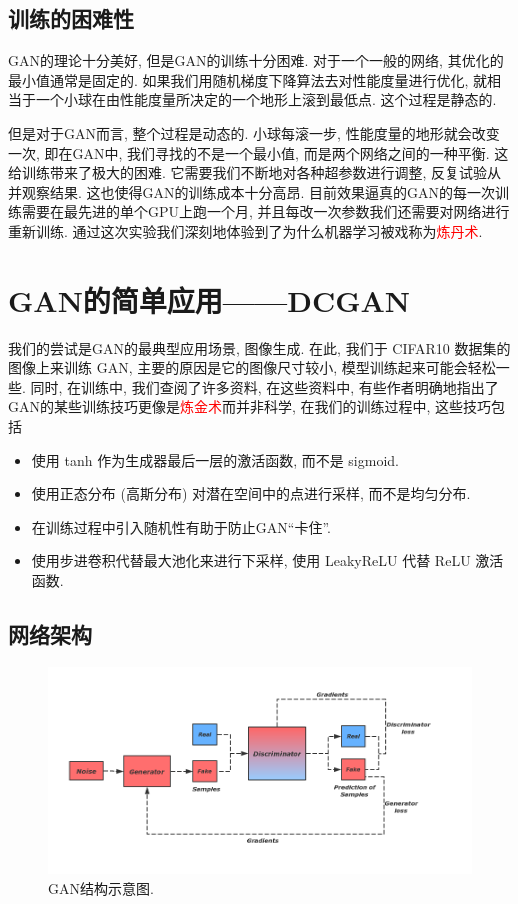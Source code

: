 \documentclass[lang=cn,11pt]{elegantpaper}
\begin{document}
\subsection{训练的困难性}

GAN的理论十分美好, 但是GAN的训练十分困难. 对于一个一般的网络, 其优化的最小值通常是固定的. 如果我们用随机梯度下降算法去对性能度量进行优化, 就相当于一个小球在由性能度量所决定的一个地形上滚到最低点. 这个过程是静态的. 

但是对于GAN而言, 整个过程是动态的. 小球每滚一步, 性能度量的地形就会改变一次, 即在GAN中, 我们寻找的不是一个最小值, 而是两个网络之间的一种平衡. 这给训练带来了极大的困难. 它需要我们不断地对各种超参数进行调整, 反复试验从并观察结果. 这也使得GAN的训练成本十分高昂. 目前效果逼真的GAN的每一次训练需要在最先进的单个GPU上跑一个月, 并且每改一次参数我们还需要对网络进行重新训练. 通过这次实验我们深刻地体验到了为什么机器学习被戏称为\textcolor{red}{炼丹术}. 

\section{GAN的简单应用——DCGAN}

我们的尝试是GAN的最典型应用场景, 图像生成. 在此, 我们于 CIFAR10 数据集的图像上来训练 GAN, 主要的原因是它的图像尺寸较小, 模型训练起来可能会轻松一些. 同时, 在训练中, 我们查阅了许多资料, 在这些资料中, 有些作者明确地指出了GAN的某些训练技巧更像是\textcolor{red}{炼金术}而并非科学, 在我们的训练过程中, 这些技巧包括
\begin{itemize}
  \item 使用 tanh 作为生成器最后一层的激活函数, 而不是 sigmoid.
  \item 使用正态分布 (高斯分布) 对潜在空间中的点进行采样, 而不是均匀分布. 
  \item 在训练过程中引入随机性有助于防止GAN“卡住”.
  \item 使用步进卷积代替最大池化来进行下采样, 使用 LeakyReLU 代替 ReLU 激活函数. 
\end{itemize}

\subsection{网络架构}
\begin{figure}[hb]
    \centering
    \includegraphics[width=.8\textwidth]{DCGAN}
    \caption{GAN结构示意图. }
\end{figure}
\end{document}
